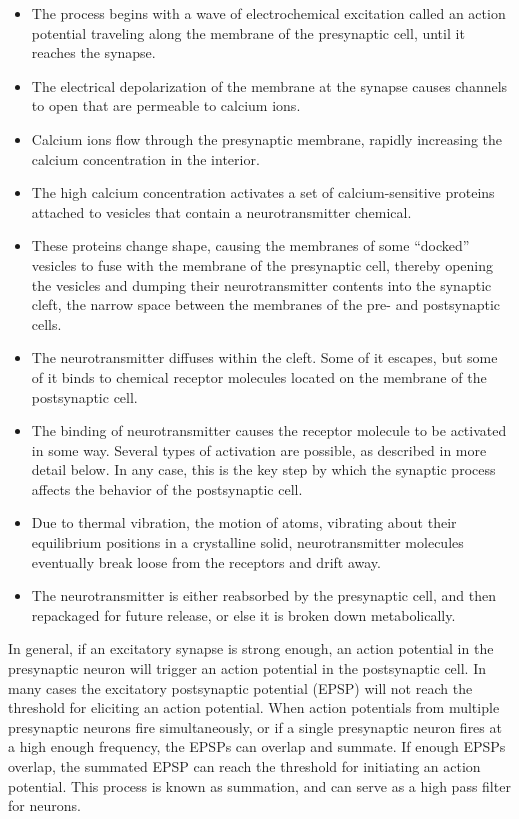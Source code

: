 \documentclass[]{book}
\providecommand{\tightlist}{%
  \setlength{\itemsep}{0pt}\setlength{\parskip}{0pt}}
\begin{document}
\begin{itemize}
\tightlist
\item
  The process begins with a wave of electrochemical excitation called an action potential traveling along the membrane of the presynaptic cell, until it reaches the synapse.
\item
  The electrical depolarization of the membrane at the synapse causes channels to open that are permeable to calcium ions.
\item
  Calcium ions flow through the presynaptic membrane, rapidly increasing the calcium concentration in the interior.
\item
  The high calcium concentration activates a set of calcium-sensitive proteins attached to vesicles that contain a neurotransmitter chemical.
\item
  These proteins change shape, causing the membranes of some ``docked'' vesicles to fuse with the membrane of the presynaptic cell, thereby opening the vesicles and dumping their neurotransmitter contents into the synaptic cleft, the narrow space between the membranes of the pre- and postsynaptic cells.
\item
  The neurotransmitter diffuses within the cleft. Some of it escapes, but some of it binds to chemical receptor molecules located on the membrane of the postsynaptic cell.
\item
  The binding of neurotransmitter causes the receptor molecule to be activated in some way. Several types of activation are possible, as described in more detail below. In any case, this is the key step by which the synaptic process affects the behavior of the postsynaptic cell.
\item
  Due to thermal vibration, the motion of atoms, vibrating about their equilibrium positions in a crystalline solid, neurotransmitter molecules eventually break loose from the receptors and drift away.
\item
  The neurotransmitter is either reabsorbed by the presynaptic cell, and then repackaged for future release, or else it is broken down metabolically.
\end{itemize}

In general, if an excitatory synapse is strong enough, an action potential in the presynaptic neuron will trigger an action potential in the postsynaptic cell. In many cases the excitatory postsynaptic potential (EPSP) will not reach the threshold for eliciting an action potential. When action potentials from multiple presynaptic neurons fire simultaneously, or if a single presynaptic neuron fires at a high enough frequency, the EPSPs can overlap and summate. If enough EPSPs overlap, the summated EPSP can reach the threshold for initiating an action potential. This process is known as summation, and can serve as a high pass filter for neurons.
\end{document}
